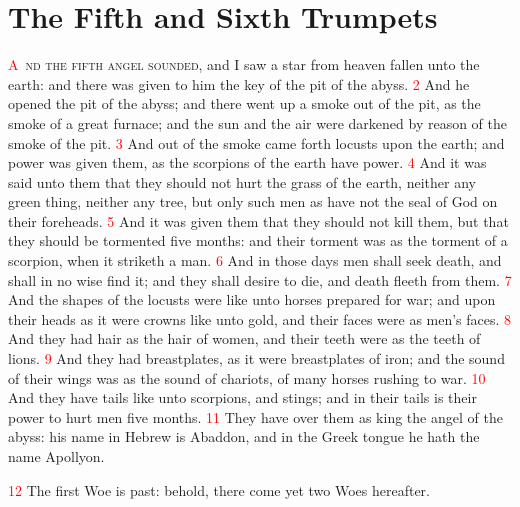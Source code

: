 \documentclass[12pt,twoside]{memoir}
\newcommand{\vnum}[1]{\textcolor{red}{\normalsize{#1}}}
\begin{document}
\chapter{The Fifth and Sixth Trumpets}
\lettrine[lines=3,slope=0.5em]{\textcolor{red}{A}}{\ nd the fifth angel sounded}, and I saw a star from heaven fallen unto the earth: and there was given to him the key of the pit of the abyss. 
\vnum{2} And he opened the pit of the abyss; and there went up a smoke out of the pit, as the smoke of a great furnace; and the sun and the air were darkened by reason of the smoke of the pit. 
\vnum{3} And out of the smoke came forth locusts upon the earth; and power was given them, as the scorpions of the earth have power. 
\vnum{4} And it was said unto them that they should not hurt the grass of the earth, neither any green thing, neither any tree, but only such men as have not the seal of God on their foreheads. 
\vnum{5} And it was given them that they should not kill them, but that they should be tormented five months: and their torment was as the torment of a scorpion, when it striketh a man. 
\vnum{6} And in those days men shall seek death, and shall in no wise find it; and they shall desire to die, and death fleeth from them. 
\vnum{7} And the shapes of the locusts were like unto horses prepared for war; and upon their heads as it were crowns like unto gold, and their faces were as men’s faces. 
\vnum{8} And they had hair as the hair of women, and their teeth were as the teeth of lions. 
\vnum{9} And they had breastplates, as it were breastplates of iron; and the sound of their wings was as the sound of chariots, of many horses rushing to war. 
\vnum{10} And they have tails like unto scorpions, and stings; and in their tails is their power to hurt men five months. 
\vnum{11} They have over them as king the angel of the abyss: his name in Hebrew is Abaddon, and in the Greek tongue he hath the name Apollyon.

\vnum{12} The first Woe is past: behold, there come yet two Woes hereafter.
\end{document}
